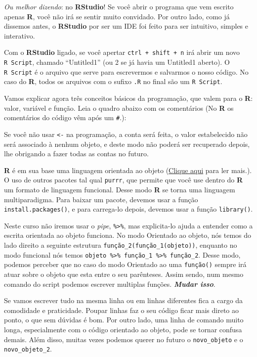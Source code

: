 \documentclass[
]{article}
\begin{document}
\emph{Ou melhor dizendo}: no \textbf{RStudio}! Se você abrir o programa
que vem escrito apenas \textbf{R}, você não irá se sentir muito
convidado. Por outro lado, como já dissemos antes, o \textbf{RStudio}
por ser um IDE foi feito para ser intuitivo, simples e interativo.

Com o \textbf{RStudio} ligado, se você apertar
\texttt{ctrl\ +\ shift\ +\ n} irá abrir um novo \texttt{R\ Script},
chamado ``Untitled1'' (ou 2 se já havia um Untitled1 aberto). O
\texttt{R\ Script} é o arquivo que serve para escrevermos e salvarmos o
nosso código. No caso do \textbf{R}, todos os arquivos com o sufixo
\texttt{.R} no final são um \texttt{R\ Script}.

Vamos explicar agora três conceitos básicos da programação, que valem
para o \textbf{R}: valor, variável e função. Leia o quadro abaixo com os
comentários (No \textbf{R} os comentários do código vêm após um
\texttt{\#}.):

Se você não usar \texttt{\textless{}-} na programação, a conta será
feita, o valor estabelecido não será associado à nenhum objeto, e deste
modo não poderá ser recuperado depois, lhe obrigando a fazer todas as
contas no futuro.

\textbf{R} é em sua base uma linguagem orientada ao objeto
(\href{https://pt.wikipedia.org/wiki/Orienta\%C3\%A7\%C3\%A3o_a_objetos}{Clique
aqui} para ler mais.). O uso de outros pacotes tal qual \texttt{purrr},
que permite que você use dentro do \textbf{R} um formato de linguagem
funcional. Desse modo \textbf{R} se torna uma linguagem multiparadigma.
Para baixar um pacote, devemos usar a função
\texttt{install.packages()}, e para carrega-lo depois, devemos usar a
função \texttt{library()}.

Neste curso não iremos usar o \emph{pipe}, \texttt{\%\textgreater{}\%},
mas explicita-lo ajuda a entender como a escrita orientada ao objeto
funciona. No modo Orientado ao objeto, nós temos do lado direito a
seguinte estrutura \texttt{função\_2(função\_1(objeto))}, enquanto no
modo funcional nós temos
\texttt{objeto\ \%\textgreater{}\%\ função\_1\ \%\textgreater{}\%\ função\_2}.
Desse modo, podemos perceber que no caso do modo Orientado ao uma
\texttt{função()} sempre irá atuar sobre o objeto que esta entre o seu
parênteses. Assim sendo, num mesmo comando do script podemos escrever
multiplas funções. \textbf{\emph{Mudar isso}}.

Se vamos escrever tudo na mesma linha ou em linhas diferentes fica a
cargo da comodidade e praticidade. Poupar linhas faz o seu código ficar
mais direto ao ponto, o que sem dúvidas é bom. Por outro lado, uma linha
de comando muito longa, especialmente com o código orientado ao objeto,
pode se tornar confusa demais. Além disso, muitas vezes podemos querer
no futuro o \texttt{novo\_objeto} e o \texttt{novo\_objeto\_2}.
\end{document}
